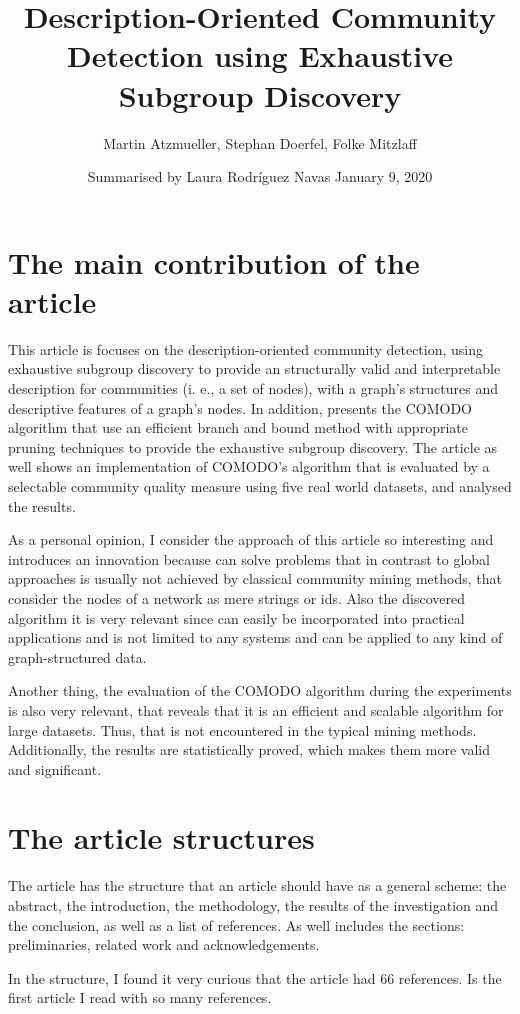 \documentclass[a4paper]{article}
\title{Description-Oriented Community Detection using Exhaustive Subgroup Discovery}
\date{Summarised by Laura Rodríguez Navas \vskip 0.35cm January 9, 2020}
\author{Martin Atzmueller, Stephan Doerfel, Folke Mitzlaff}
\begin{document}
	
\maketitle

\section*{The main contribution of the article}
This article is focuses on the description-oriented community detection, using exhaustive subgroup discovery to provide an structurally valid and interpretable description for communities (i. e., a set of nodes), with a graph's structures and descriptive features of a graph’s nodes. In addition, presents the COMODO algorithm that use an efficient branch and bound method with appropriate pruning techniques to provide the exhaustive subgroup discovery. The article as well shows an implementation of COMODO's algorithm that is evaluated by a selectable community quality measure using five real world datasets, and analysed the results.
\vskip 0.35cm

As a personal opinion, I consider the approach of this article so interesting and introduces an innovation because can solve problems that in contrast to global approaches is usually not achieved by classical community mining methods, that consider the nodes of a network as mere strings or ids. Also the discovered algorithm it is very relevant since can easily be incorporated into practical applications and is not limited to any systems and can be applied to any kind of graph-structured data.
\vskip 0.35cm

Another thing, the evaluation of the COMODO algorithm during the experiments is also very relevant, that reveals that it is an efficient and scalable algorithm for large datasets. Thus, that is not encountered in the typical mining methods. Additionally, the results are statistically proved, which makes them more valid and significant.	

\section*{The article structures}
The article has the structure that an article should have as a general scheme: the abstract, the introduction, the methodology, the results of the investigation and the conclusion, as well as a list of references. As well includes the sections: preliminaries, related work and acknowledgements.
\vskip 0.35cm

In the structure, I found it very curious that the article had 66 references. Is the first article I read with so many references.
 
\end{document}
